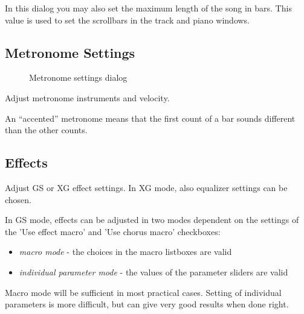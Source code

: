 \documentclass[letterpaper]{report}
\begin{document}
In this dialog you may also set the maximum length of the song in bars.
This value is used to set the scrollbars in the track and piano windows.


\subsection{Metronome Settings}\label{metroset}

\begin{figure}
\caption{Metronome settings dialog}
\end{figure}

Adjust metronome instruments and velocity.

An ``accented'' metronome means that the first count of a bar sounds different
than the other counts.

\subsection{Effects}

Adjust GS or XG effect settings. In XG mode, also equalizer settings can be
chosen.

In GS mode, effects can be adjusted in two modes dependent on the settings
of the 'Use effect macro' and 'Use chorus macro' checkboxes:
\begin{itemize}
\item {\em macro mode} - the choices in the macro listboxes are valid
\item {\em individual parameter mode} - the values of the parameter
sliders are valid
\end{itemize}

Macro mode will be sufficient in most practical cases. Setting of individual
parameters is more difficult, but can give very good results when done right.
\end{document}
